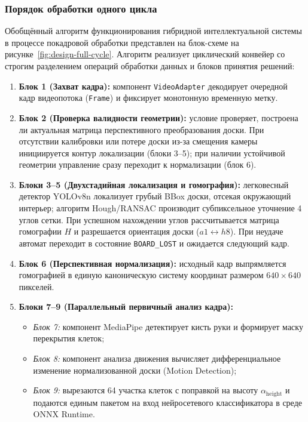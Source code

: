 \subsubsection{Порядок обработки одного цикла}

Обобщённый алгоритм функционирования гибридной интеллектуальной системы в процессе покадровой обработки представлен на блок-схеме на рисунке~\ref{fig:design-full-cycle}. Алгоритм реализует циклический конвейер со строгим разделением операций обработки данных и блоков принятия решений:

\begin{enumerate}
    \item \textbf{Блок 1 (Захват кадра):} компонент \texttt{VideoAdapter} декодирует очередной кадр видеопотока (\texttt{Frame}) и фиксирует монотонную временную метку.
    \item \textbf{Блок 2 (Проверка валидности геометрии):} условие проверяет, построена ли актуальная матрица перспективного преобразования доски. При отсутствии калибровки или потере доски из-за смещения камеры инициируется контур локализации (блоки 3--5); при наличии устойчивой геометрии управление сразу переходит к нормализации (блок 6).
    \item \textbf{Блоки 3--5 (Двухстадийная локализация и гомография):} легковесный детектор YOLOv8n локализует грубый BBox доски, отсекая окружающий интерьер; алгоритм Hough/RANSAC производит субпиксельное уточнение 4 углов сетки. При успешном нахождении углов рассчитывается матрица гомографии $H$ и разрешается ориентация доски ($a1 \leftrightarrow h8$). При неудаче автомат переходит в состояние \texttt{BOARD\_LOST} и ожидается следующий кадр.
    \item \textbf{Блок 6 (Перспективная нормализация):} исходный кадр выпрямляется гомографией в единую каноническую систему координат размером $640 \times 640$ пикселей.
    \item \textbf{Блоки 7--9 (Параллельный первичный анализ кадра):}
    \begin{itemize}
        \item \textit{Блок 7:} компонент MediaPipe детектирует кисть руки и формирует маску перекрытия клеток;
        \item \textit{Блок 8:} компонент анализа движения вычисляет дифференциальное изменение нормализованной доски (Motion Detection);
        \item \textit{Блок 9:} вырезаются 64 участка клеток с поправкой на высоту $\alpha_{\text{height}}$ и подаются единым пакетом на вход нейросетевого классификатора в среде ONNX Runtime.

\end{itemize}
\end{enumerate}
